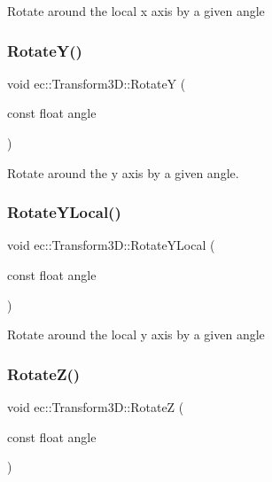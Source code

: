 Rotate around the local x axis by a given angle \mbox{\label{classec_1_1_transform3_d_a71e31dbecd1bfad8754c7b3bca691876}} 
\subsubsection{\texorpdfstring{Rotate\+Y()}{RotateY()}}
{\footnotesize\ttfamily void ec\+::\+Transform3\+D\+::\+RotateY (\begin{DoxyParamCaption}\item[{const float}]{angle }\end{DoxyParamCaption})}

Rotate around the y axis by a given angle. \mbox{\label{classec_1_1_transform3_d_a593767a5127e4156c309b3613a162b42}} 
\subsubsection{\texorpdfstring{Rotate\+Y\+Local()}{RotateYLocal()}}
{\footnotesize\ttfamily void ec\+::\+Transform3\+D\+::\+Rotate\+Y\+Local (\begin{DoxyParamCaption}\item[{const float}]{angle }\end{DoxyParamCaption})}

Rotate around the local y axis by a given angle \mbox{\label{classec_1_1_transform3_d_aff76dc65f161ff8401976561772dd2fc}} 
\subsubsection{\texorpdfstring{Rotate\+Z()}{RotateZ()}}
{\footnotesize\ttfamily void ec\+::\+Transform3\+D\+::\+RotateZ (\begin{DoxyParamCaption}\item[{const float}]{angle }\end{DoxyParamCaption})}

